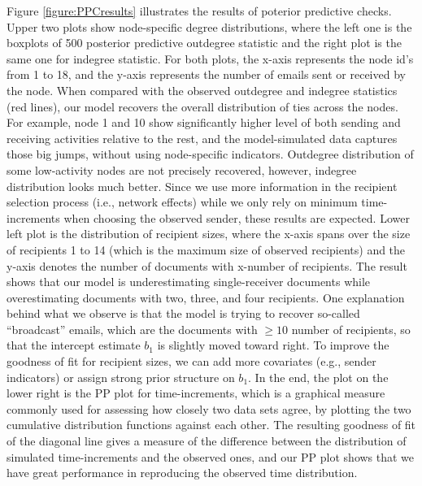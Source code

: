 \documentclass[12pt]{article}
\begin{document}
	Figure \ref{figure:PPCresults} illustrates the results of poterior predictive checks. Upper two plots show node-specific degree distributions, where the left one is the boxplots of 500 posterior predictive outdegree statistic and the right plot is the same one for indegree statistic. For both plots, the x-axis represents the node id's from 1 to 18, and the y-axis represents the number of emails sent or received by the node. When compared with the observed outdegree and indegree statistics (red lines), our model recovers the overall distribution of ties across the nodes. For example, node 1 and 10 show significantly higher level of both sending and receiving activities relative to the rest, and the model-simulated data captures those big jumps, without using node-specific indicators. Outdegree distribution of some low-activity nodes are not precisely recovered, however, indegree distribution looks much better. Since we use more information in the recipient selection process (i.e., network effects) while we only rely on minimum time-increments when choosing the observed sender, these results are expected. Lower left plot is the distribution of recipient sizes, where the x-axis spans over the size of recipients 1 to 14 (which is the maximum size of observed recipients) and the y-axis denotes the number of documents with x-number of recipients. The result shows that our model is underestimating single-receiver documents while overestimating documents with two, three, and four recipients. One explanation behind what we observe is that the model is trying to recover so-called ``broadcast'' emails, which are the documents with $\geq 10$ number of recipients, so that the intercept estimate $b_1$ is slightly moved toward right. To improve the goodness of fit for recipient sizes, we can add more covariates (e.g., sender indicators) or assign strong prior structure on $b_1$. In the end, the plot on the lower right is the PP plot for time-increments, which is a graphical measure commonly used for assessing how closely two data sets agree, by plotting the two cumulative distribution functions against each other. The resulting goodness of fit of the diagonal line gives a measure of the difference between the distribution of simulated time-increments and the observed ones, and our PP plot shows that we have great performance in reproducing the observed time distribution.
\end{document}
